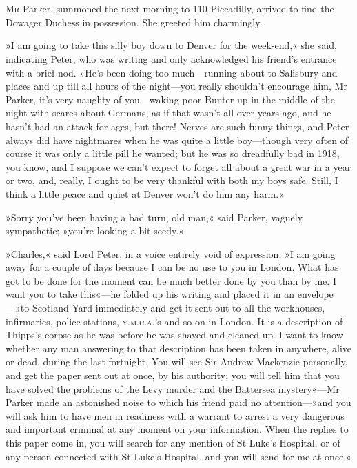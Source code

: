 \chapter[Chapter \thechapter]{}
\lettrine[lines=4]{M}{r} Parker, summoned the next morning to 110 Piccadilly, arrived to find the Dowager Duchess in possession. She greeted him charmingly.

\zz
»I am going to take this silly boy down to Denver for the week-end,« she said, indicating Peter, who was writing and only acknowledged his friend's entrance with a brief nod. »He's been doing too much—running about to Salisbury and places and up till all hours of the night—you really shouldn't encourage him, Mr Parker, it's very naughty of you—waking poor Bunter up in the middle of the night with scares about Germans, as if that wasn't all over years ago, and he hasn't had an attack for ages, but there! Nerves are such funny things, and Peter always did have nightmares when he was quite a little boy—though very often of course it was only a little pill he wanted; but he was so dreadfully bad in 1918, you know, and I suppose we can't expect to forget all about a great war in a year or two, and, really, I ought to be very thankful with both my boys safe. Still, I think a little peace and quiet at Denver won't do him any harm.«

»Sorry you've been having a bad turn, old man,« said Parker, vaguely sympathetic; »you're looking a bit seedy.«

»Charles,« said Lord Peter, in a voice entirely void of expression, »I am going away for a couple of days because I can be no use to you in London. What has got to be done for the moment can be much better done by you than by me. I want you to take this«---he folded up his writing and placed it in an envelope---»to Scotland Yard immediately and get it sent out to all the workhouses, infirmaries, police stations, \textsc{y.m.c.a.}'s and so on in London. It is a description of Thipps's corpse as he was before he was shaved and cleaned up. I want to know whether any man answering to that description has been taken in anywhere, alive or dead, during the last fortnight. You will see Sir Andrew Mackenzie personally, and get the paper sent out at once, by his authority; you will tell him that you have solved the problems of the Levy murder and the Battersea mystery«---Mr Parker made an astonished noise to which his friend paid no attention---»and you will ask him to have men in readiness with a warrant to arrest a very dangerous and important criminal at any moment on your information. When the replies to this paper come in, you will search for any mention of St Luke's Hospital, or of any person connected with St Luke's Hospital, and you will send for me at once.«


